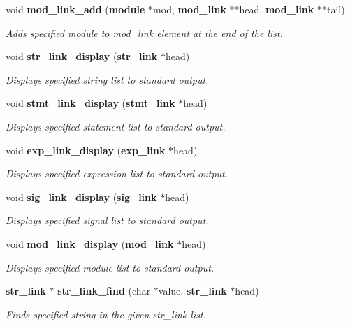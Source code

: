 \begin{CompactItemize}
void {\bf mod\_\-link\_\-add} ({\bf module} $\ast$mod, {\bf mod\_\-link} $\ast$$\ast$head, {\bf mod\_\-link} $\ast$$\ast$tail)
\begin{CompactList}\small\item\em Adds specified module to mod\_\-link element at the end of the list. \item\end{CompactList}\item 
void {\bf str\_\-link\_\-display} ({\bf str\_\-link} $\ast$head)
\begin{CompactList}\small\item\em Displays specified string list to standard output. \item\end{CompactList}\item 
void {\bf stmt\_\-link\_\-display} ({\bf stmt\_\-link} $\ast$head)
\begin{CompactList}\small\item\em Displays specified statement list to standard output. \item\end{CompactList}\item 
void {\bf exp\_\-link\_\-display} ({\bf exp\_\-link} $\ast$head)
\begin{CompactList}\small\item\em Displays specified expression list to standard output. \item\end{CompactList}\item 
void {\bf sig\_\-link\_\-display} ({\bf sig\_\-link} $\ast$head)
\begin{CompactList}\small\item\em Displays specified signal list to standard output. \item\end{CompactList}\item 
void {\bf mod\_\-link\_\-display} ({\bf mod\_\-link} $\ast$head)
\begin{CompactList}\small\item\em Displays specified module list to standard output. \item\end{CompactList}\item 
{\bf str\_\-link} $\ast$ {\bf str\_\-link\_\-find} (char $\ast$value, {\bf str\_\-link} $\ast$head)
\begin{CompactList}\small\item\em Finds specified string in the given str\_\-link list. \item\end{CompactList}\item 

\end{CompactItemize}

